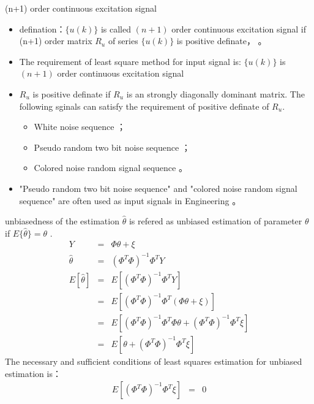 \begin{frame}{(n+1) order continuous excitation signal }
\begin{itemize}
\item defination：$\{u(k)\}$ is called $(n+1)$ order continuous excitation signal if  (n+1) order matrix $R_u$ of series $\{u(k)\}$ is positive definate，
。
\item The requirement of least square method for input signal is: $\{u(k)\}$ is $(n+1)$ order continuous excitation signal
\item $R_u$ is positive definate if $R_u$ is an strongly diagonally dominant matrix. The following sginals can satisfy the requirement of positive definate of $R_u$.
\begin{itemize}
\item  White noise sequence ；
\item  Pseudo random two bit noise sequence ；
\item  Colored noise random signal sequence 。
\end{itemize}
\item  "Pseudo random two bit noise sequence" and "colored noise random signal sequence" are often used as input signals in Engineering 。
\end{itemize}
\end{frame}


\begin{frame}{unbiasedness of the estimation}
$\hat\theta$ is refered as unbiased estimation of parameter $\theta$ if $E\{\hat\theta\}=\theta$ .
\begin{eqnarray*}
Y &=& \Phi\theta +\xi \\
\hat\theta &=& (\Phi^T\Phi)^{-1}\Phi^T Y \\
E[\hat\theta] &=& E[(\Phi^T\Phi)^{-1}\Phi^T Y] \\
&=& E[(\Phi^T\Phi)^{-1}\Phi^T (\Phi\theta+\xi)] \\
&=& E[(\Phi^T\Phi)^{-1}\Phi^T \Phi\theta+(\Phi^T\Phi)^{-1}\Phi^T \xi] \\
&=& E[\theta+(\Phi^T\Phi)^{-1}\Phi^T \xi] 
\end{eqnarray*}
 The necessary and sufficient conditions of least squares estimation for unbiased estimation is：
\begin{eqnarray*}
 E[(\Phi^T\Phi)^{-1}\Phi^T \xi] &=& 0
\end{eqnarray*}
\end{frame}

